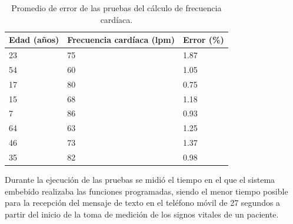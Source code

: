 \documentclass[journal]{IEEEtran}
\begin{document}
\begin{table}[htbp]
	\begin{center}
		\begin{tabular}{|l|l|l|}
			\hline
			\textbf{Edad (años)} & \textbf{Frecuencia cardíaca (lpm)} & \textbf{Error (\%)} \\
			\hline \hline
			23 & 75 & 1.87 \\
			\hline
			54 & 60 & 1.05 \\
			\hline
			17 & 80 & 0.75 \\
			\hline
			15 & 68 & 1.18\\
			\hline
			7 & 86 & 0.93 \\
			\hline
			64 & 63 & 1.25 \\
			\hline
			46 & 73 & 1.37 \\
			\hline
			35 & 82 & 0.98 \\
			\hline
		\end{tabular}
		\caption{Promedio de error de las pruebas del cálculo de frecuencia cardíaca.}
		\label{sensorPulso:promedioError}
	\end{center}
\end{table}

Durante la ejecución de las pruebas se midió el tiempo en el que el sistema embebido realizaba las funciones programadas, siendo el menor tiempo posible para la recepción del mensaje de texto en el teléfono móvil de 27 segundos a partir del inicio de la toma de medición de los signos vitales de un paciente.


%
%
\end{document}
